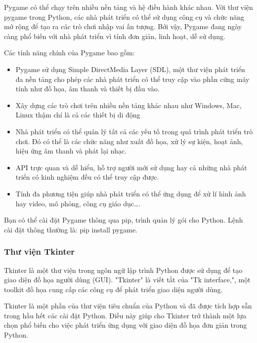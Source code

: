 \documentclass[a4paper]{article}
\begin{document}
    \hspace*{0.5cm} Pygame có thể chạy trên nhiều nền tảng và hệ điều hành khác nhau. Với thư viện pygame trong Python, các nhà phát triển có thể sử dụng công cụ và chức năng mở rộng để tạo ra các trò chơi nhập vai ấn tượng. Bởi vậy, Pygame đang ngày càng phổ biến với nhà phát triển vì tính đơn giản, linh hoạt, dễ sử dụng.

    \hspace*{0.5cm} Các tính năng chính của Pygame bao gồm:
    \begin{itemize}
          \item Pygame sử dụng Simple DirectMedia Layer (SDL), một thư viện phát triển đa nền tảng cho phép các nhà phát triển có thể truy cập vào phần cứng máy tính như đồ họa, âm thanh và thiết bị đầu vào.
          \item Xây dựng các trò chơi trên nhiều nền tảng khác nhau như Windows, Mac, Linux thậm chí là cả các thiết bị di động
          \item Nhà phát triển có thể quản lý tất cả các yếu tố trong quá trình phát triển trò chơi. Đó có thể là các chức năng như xuất đồ họa, xử lý sự kiện, hoạt ảnh, hiệu ứng âm thanh và phát lại nhạc.
          \item API trực quan và dễ hiểu, hỗ trợ người mới sử dụng hay cả những nhà phát triển có kinh nghiệm đều có thể truy cập được.
          \item Tính đa phương tiện giúp nhà phát triển có thể ứng dụng để xử lí hình ảnh hay video, mô phỏng, công cụ giáo dục….
      \end{itemize}  

      \hspace*{0.5cm} Bạn có thể cài đặt Pygame thông qua pip, trình quản lý gói cho Python. Lệnh cài đặt thông thường là: pip install pygame.
\subsubsection{Thư viện Tkinter}
     \hspace*{0.5cm} Tkinter là một thư viện trong ngôn ngữ lập trình Python được sử dụng để tạo giao diện đồ họa người dùng (GUI). "Tkinter" là viết tắt của "Tk interface,", một toolkit đồ họa cung cấp các công cụ để phát triển giao diện người dùng.
     
      \hspace*{0.5cm} Tkinter là một phần của thư viện tiêu chuẩn của Python và đã được tích hợp sẵn trong hầu hết các cài đặt Python. Điều này giúp cho Tkinter trở thành một lựa chọn phổ biến cho việc phát triển ứng dụng với giao diện đồ họa đơn giản trong Python.
      
\end{document}

